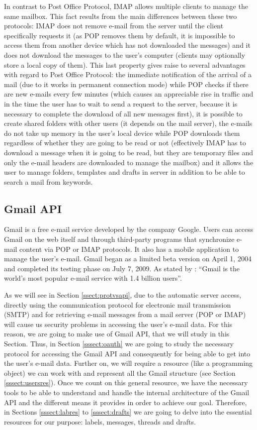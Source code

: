 In contrast to Post Office Protocol, IMAP allows multiple clients to manage the same mailbox. This fact results from the main differences between these two protocols: IMAP does not remove e-mail from the server until the client specifically requests it (as POP removes them by default, it is impossible to access them from another device which has not downloaded the messages) and it does not download the messages to the user's computer (clients may optionally store a local copy of them). This last property gives raise to several advantages with regard to Post Office Protocol: the immediate notification of the arrival of a mail (due to it works in permanent connection mode) while POP checks if there are new e-mails every few minutes (which causes an appreciable rise in traffic and in the time the user has to wait to send a request to the server, because it is necessary to complete the download of all new messages first), it is possible to create shared folders with other users (it depends on the mail server), the e-mails do not take up memory in the user's local device while POP downloads them regardless of whether they are going to be read or not (effectively IMAP has to download a message when it is going to be read, but they are temporary files and only the e-mail headers are downloaded to manage the mailbox) and it allows the user to manage folders, templates and drafts in server in addition to be able to search a mail from keywords.

\subsection{Gmail API}\label{ssect:gmailapi}
Gmail is a free e-mail service developed by the company Google. Users can access Gmail on the web itself and through third-party programs that synchronize e-mail content via POP or IMAP protocols. It also has a mobile application to manage the user's e-mail. Gmail began as a limited beta version on April 1, 2004 and completed its testing phase on July 7, 2009. As stated by \cite{gmailbbc}: ``Gmail is the world's most popular e-mail service with 1.4 billion users''.

As we will see in Section \ref{ssect:protvsapi}, due to the automatic server access, directly using the communication protocol for electronic mail transmission (SMTP) and for retrieving e-mail messages from a mail server (POP or IMAP) will cause us security problems in accessing the user's e-mail data. For this reason, we are going to make use of Gmail API, that we will study in this Section. Thus, in Section \ref{sssect:oauth} we are going to study the necessary protocol for accessing the Gmail API and consequently for being able to get into the user's e-mail data. Further on, we will require a resource (like a programming object) we can work with and represent all the Gmail structure (see Section \ref{sssect:usersres}). Once we count on this general resource, we have the necessary tools to be able to understand and handle the internal architecture of the Gmail API and the different means it provides in order to achieve our goal. Therefore, in Sections \ref{sssect:labres} to \ref{sssect:drafts} we are going to delve into the essential resources for our purpose: labels, messages, threads and drafts.

